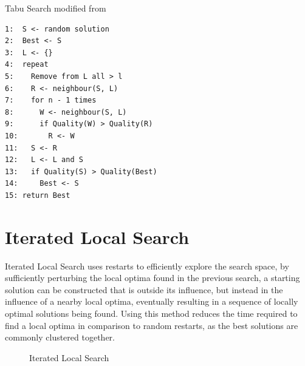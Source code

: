 \documentclass[]{final_report}
\begin{document}
\newpage
Tabu Search modified from \cite{luke:2013}

\begin{verbatim}
1:  S <- random solution
2:  Best <- S
3:  L <- {}
4:  repeat
5:    Remove from L all > l
6:    R <- neighbour(S, L)
7:    for n - 1 times
8:      W <- neighbour(S, L)
9:      if Quality(W) > Quality(R)
10:       R <- W
11:   S <- R
12:   L <- L and S
13:   if Quality(S) > Quality(Best)
14:     Best <- S
15: return Best
\end{verbatim}

\newpage
\section*{Iterated Local Search}

Iterated Local Search uses restarts to efficiently explore the search space, by sufficiently perturbing the local optima found in the previous search, a starting solution can be constructed that is outside its influence, but instead in the influence of a nearby local optima, eventually resulting in a sequence of locally optimal solutions being found. Using this method reduces the time required to find a local optima in comparison to random restarts, as the best solutions are commonly clustered together.

\begin{figure}[h]
	\centering
	\fboxsep 2mm
	\caption{\label{fig:ils} Iterated Local Search}
\end{figure}
\end{document}
